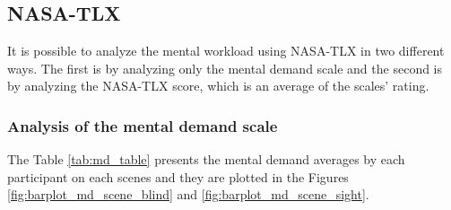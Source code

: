 \subsection{NASA-TLX}
\label{subsec:results_nasa_tlx}

It is possible to analyze the mental workload using NASA-TLX in two different ways. The first is by analyzing only the mental demand scale and the second is by analyzing the NASA-TLX score, which is an average of the scales' rating.

\subsubsection{Analysis of the mental demand scale}

The Table \ref{tab:md_table} presents the mental demand averages by each participant on each scenes and they are plotted in the Figures \ref{fig:barplot_md_scene_blind} and \ref{fig:barplot_md_scene_sight}.



